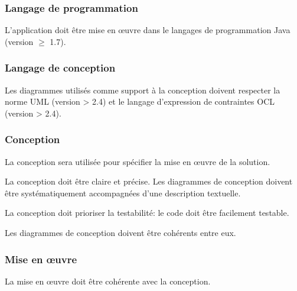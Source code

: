 	\subsubsection{Langage de programmation}
\begin{requirement}[Java]
	L’application doit être mise en œuvre dans le langages de programmation Java (version $\ge$ 1.7).
\end{requirement}


\subsubsection{Langage de conception}
\begin{requirement}[UML]
	Les diagrammes utilisés comme support à la conception doivent respecter la norme UML (version > 2.4) et le langage d’expression de contraintes OCL (version > 2.4).
\end{requirement}

\subsubsection{Conception}
La conception sera utilisée pour spécifier la mise en œuvre de la solution.

\begin{requirement}
	La conception doit être claire et précise.
	Les diagrammes de conception doivent être systématiquement accompagnées d'une description textuelle.
\end{requirement}

\begin{requirement}
	La conception doit prioriser la testabilité: le code doit être facilement testable. 
\end{requirement}

\begin{requirement}
Les diagrammes de conception doivent être cohérents entre eux.
\end{requirement}


\subsubsection{Mise en œuvre}
\begin{requirement}
La mise en œuvre doit être cohérente avec la conception.	
\end{requirement}

